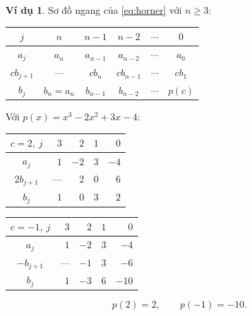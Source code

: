 \documentclass[12pt,a4paper,oneside]{book}
\numberwithin{algorithm}{chapter}
\theoremstyle{definition}
\newtheorem{vidu}{Ví dụ}[chapter]
\begin{document}
\begin{vidu}
Sơ đồ ngang của \eqref{eq:horner} với $n\geq3$:
\begin{center}
\begin{tabular}{c|ccccc}
\toprule
$j$ & $n$ & $n-1$ & $n-2$ & $\cdots$ & $0$\\
\midrule
$a_j$ & $a_n$ & $a_{n-1}$ & $a_{n-2}$ & $\cdots$ & $a_0$\\
$cb_{j+1}$ & --- & $cb_n$ & $cb_{n-1}$ & $\cdots$ & $cb_1$\\
\midrule
$b_j$ & $b_n=a_n$ & $b_{n-1}$ & $b_{n-2}$ & $\cdots$ & $\boxed{p(c)}$\\
\bottomrule
\end{tabular}
\end{center}

Với $p(x)=x^3-2x^2+3x-4$:
\begin{center}
\begin{tabular}{c|rrrr}
\toprule
$c=2,\ j$ & $3$ & $2$ & $1$ & $0$\\
\midrule
$a_j$ & $1$ & $-2$ & $3$ & $-4$\\
$2b_{j+1}$ & --- & $2$ & $0$ & $6$\\
\midrule
$b_j$ & $1$ & $0$ & $3$ & $\boxed{2}$\\
\bottomrule
\end{tabular}
\qquad
\begin{tabular}{c|rrrr}
\toprule
$c=-1,\ j$ & $3$ & $2$ & $1$ & $0$\\
\midrule
$a_j$ & $1$ & $-2$ & $3$ & $-4$\\
$-b_{j+1}$ & --- & $-1$ & $3$ & $-6$\\
\midrule
$b_j$ & $1$ & $-3$ & $6$ & $\boxed{-10}$\\
\bottomrule
\end{tabular}
\end{center}
\[
 p(2)=2,\qquad p(-1)=-10.
\]
\end{vidu}

\end{document}

